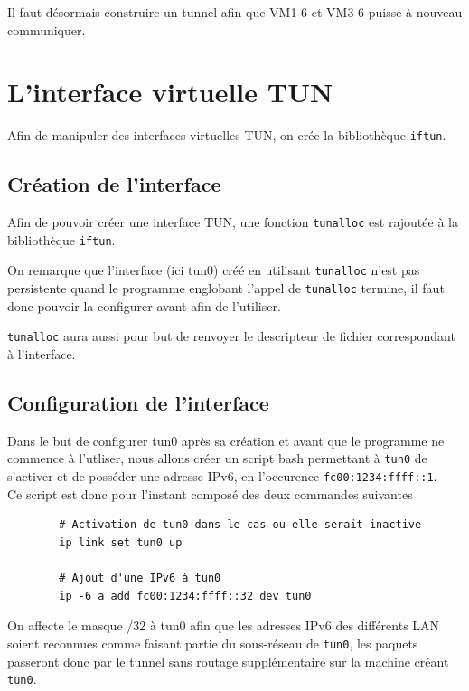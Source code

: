 \documentclass[a4paper, 10pt]{article}
\begin{document}
      Il faut désormais construire un tunnel afin que VM1-6 et VM3-6 puisse à
      nouveau communiquer.

  \section{L'interface virtuelle TUN}
    Afin de manipuler des interfaces virtuelles TUN, on crée la bibliothèque
    \verb+iftun+.

    \subsection{Création de l'interface}
      Afin de pouvoir créer une interface TUN, une fonction \verb+tunalloc+ est
      rajoutée à la bibliothèque \verb+iftun+.

      On remarque que l'interface (ici tun0) créé en utilisant \verb+tunalloc+
      n'est pas persistente quand le programme englobant l'appel de
      \verb+tunalloc+ termine, il faut donc pouvoir la configurer avant afin de
      l'utiliser.

      \verb+tunalloc+ aura aussi pour but de renvoyer le descripteur de fichier
      correspondant à l'interface. \\

    \subsection{Configuration de l'interface}
      Dans le but de configurer tun0 après sa création et avant que le programme
      ne commence à l'utliser, nous allons créer un script bash permettant à
      \verb+tun0+ de s'activer et de posséder une adresse IPv6, en l'occurence
      \verb+fc00:1234:ffff::1+. \\

      Ce script est donc pour l'instant composé des deux commandes suivantes
      \begin{verbatim}
        # Activation de tun0 dans le cas ou elle serait inactive
        ip link set tun0 up

        # Ajout d'une IPv6 à tun0
        ip -6 a add fc00:1234:ffff::32 dev tun0
      \end{verbatim}

      On affecte le masque /32 à tun0 afin que les adresses IPv6 des différents
      LAN soient reconnues comme faisant partie du sous-réseau de \verb+tun0+,
      les paquets passeront donc par le tunnel sans routage supplémentaire sur
      la machine créant \verb+tun0+.
\end{document}
